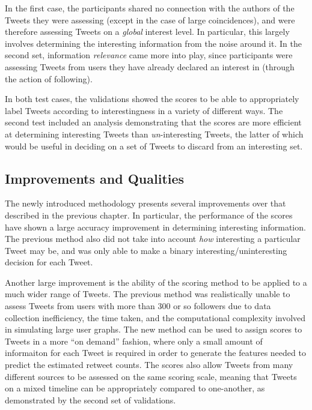 In the first case, the participants shared no connection with the authors of the Tweets they were assessing (except in the case of large coincidences), and were therefore assessing Tweets on a \textit{global} interest level. In particular, this largely involves determining the interesting information from the noise around it. In the second set, information \textit{relevance} came more into play, since participants were assessing Tweets from users they have already declared an interest in (through the action of following).

In both test cases, the validations showed the scores to be able to appropriately label Tweets according to interestingness in a variety of different ways. The second test included an analysis demonstrating that the scores are more efficient at determining interesting Tweets than \textit{un}-interesting Tweets, the latter of which would be useful in deciding on a set of Tweets to discard from an interesting set. 

\subsection{Improvements and Qualities}
The newly introduced methodology presents several improvements over that described in the previous chapter. In particular, the performance of the scores have shown a large accuracy improvement in determining interesting information. The previous method also did not take into account \textit{how} interesting a particular Tweet may be, and was only able to make a binary interesting/uninteresting decision for each Tweet.

Another large improvement is the ability of the scoring method to be applied to a much wider range of Tweets. The previous method was realistically unable to assess Tweets from users with more than 300 or so followers due to data collection inefficiency, the time taken, and the computational complexity involved in simulating large user graphs. The new method can be used to assign scores to Tweets in a more ``on demand'' fashion, where only a small amount of informaiton for each Tweet is required in order to generate the features needed to predict the estimated retweet counts. The scores also allow Tweets from many different sources to be assessed on the same scoring scale, meaning that Tweets on a mixed timeline can be appropriately compared to one-another, as demonstrated by the second set of validations.

